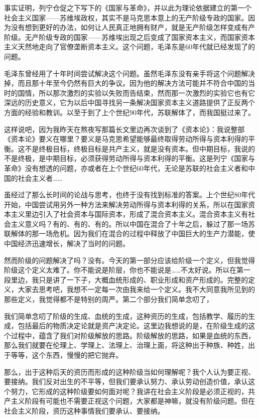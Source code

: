 \documentclass[UTF8, 12pt, a4paper]{ctexrep}
\begin{document}
事实证明，列宁仓促之下写下的《国家与革命》，并以此为理论依据建立的第一个社会主义国家——苏维埃政权，其实不是马克思本意上的无产阶级专政的国家。因为没有想到更好的办法，如何让人民真正地拥有财产，就是无产阶级怎样变成有产阶级。无产阶级专政的国家——苏维埃出现之后变成了国家资本主义，而国家资本主义天然地走向了官僚垄断资本主义。这个问题，毛泽东是60年代就已经发现了的问题。

毛泽东曾经用了十年时间尝试解决这个问题。虽然毛泽东没有亲手将这个问题解决掉，而且那十年至今仍然有巨大的争议。因为他的解决方法可能并不符合中国的当时的国情，所以那次激烈的实验以失败而告结束，然而那一次激烈的实验它也有它深远的历史意义，它为以后中国寻找另一条解决国家资本主义道路提供了正反两个方面的经验和教训。以至于到了上个世纪90年代，苏联解体了，而我国挺过来了。

这样说吧，因为我昨天在熬夜写那篇长文里边再次谈到了《资本论》：我说整部《资本论》要义在哪里？要义是马克思希望能够最终取得劳动所得与资本利得的平衡。这不是终极目标，终极目标是共产主义，就是没有资本。但中期目标，我说的不是终极，是中期目标，必须获得劳动所得与资本利得的平衡。这是列宁《国家与革命》没有想透的问题，亦或者在上个世纪60年代，无论是苏联的社会主义者和中国的社会主义者……

虽经过了那么长时间的论战与思考，也终于没有找到标准的答案。上个世纪80年代开始，中国尝试用另外一种方法来解决劳动所得与资本利得的关系，所以在国家资本主义里边引入了社会资本与国际资本，形成了混合资本主义。混合资本主义有社会主义意义吗？有的、有的、有的。所以中国在混合了十年之后，躲过了那一场苏联解体的那一场危机。因为我们在混合的过程中释放了中国巨大的生产力潜能，使中国经济迅速增长，解决了当时的问题。

然而阶级的问题解决了吗？没有。今天的第一部分应该给阶级一个定义，但我觉得阶级这个定义太难了。你不能说是阶层，你也不能说是……不太好说。所以在第一段里边，我只是讲了一下子，大概血统形成的、职业形成和资产形成的。完整的定义，大家去思考吧，我想不一定每一次由我来给一个定义。我不大同意我所见到的那些定义，我觉得都不是特别的周严。第二个部分我们简单念叨了，

我们简单念叨了阶级的生成、血统的生成，这种资历的生成，包括教学、履历的生成，包括最后的物质决定论就是资产决定论。这里边我想说的是，在阶级生成的这个过程中，蕴含了我们对阶级解放的思路。阶级解放的思路，如果是血统的东西，那么我们就要在伦理上、学理上、法理上、治理上面，将这种出于种族、种姓，出于等等，这个东西，慢慢的把它抛弃。

那么，出于这种后天的资历而形成的这种阶级当如何理解呢？我个人认为要正视、要接纳。我们反对出生的不平等，但我们要承认努力、承认劳动创造价值，承认这个努力，它形成的这种阶级要如何面对呢？我讲在社会主义阶段是必须正视的，共产主义阶段有可能也不需要正视这个问题，大家都是神嘛，就没有阶级问题。但在社会主义阶段，资历这种事情我们要承认、要接纳。
\end{document}
